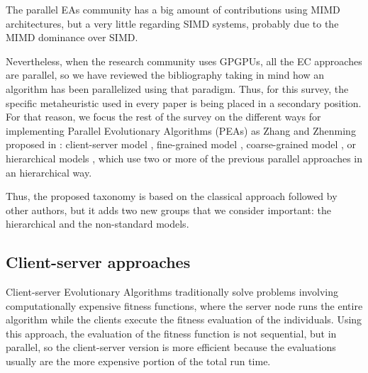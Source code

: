 \documentclass{article}
\begin{document}
The parallel EAs community has a big amount of contributions using
MIMD architectures, but a very little regarding SIMD systems, probably due to the MIMD dominance over SIMD.

Nevertheless, when the research community uses GPGPUs, all the EC approaches are parallel, so we have reviewed the bibliography taking in mind how an algorithm has been parallelized using that paradigm. Thus, for this survey, the specific metaheuristic used in every paper is being placed in a secondary position.
For that reason, we focus the rest of the survey on the different ways for implementing Parallel Evolutionary Algorithms (PEAs) as Zhang and Zhenming proposed in \cite{ZhangImplementationserverClient}: client-server model \cite{man-leung-wong-parallel-2005}, fine-grained model \cite{jian_ming_li_efficient_2007}, coarse-grained model \cite{Maitre:2009:CGP:1569901.1570089}, %
or hierarchical models  \cite{DBLP:conf/gecco/PospichalMOSJ11},  which use two or more of the previous parallel approaches in an hierarchical way.


Thus, the proposed taxonomy is based on the classical approach followed by other authors, but it adds two new groups that we consider important: the hierarchical and the non-standard models.

\subsection{Client-server approaches}
\label{subsec:serverClientapproaches}
Client-server Evolutionary Algorithms traditionally solve problems
involving computationally expensive fitness functions, where the
server node runs the entire algorithm while the clients execute the
fitness evaluation of the individuals. Using this approach, the
evaluation of the fitness function is not sequential, but in parallel,
so the client-server version is more efficient because the evaluations
usually are the more expensive portion of the total run time.

\end{document}

